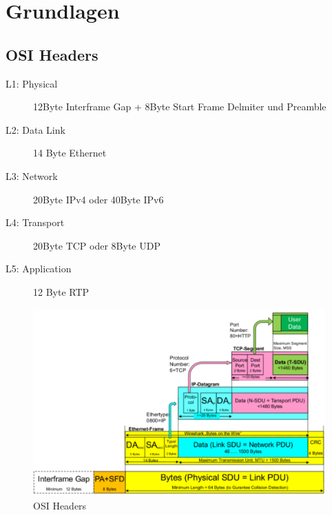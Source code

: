 


\newcommand{\SUBJECT}{Zusammenfassung}
\newcommand{\TITLE}{Computernetze 2}




\section{Grundlagen}
\subsection{OSI Headers}
\begin{description}
	\item[L1: Physical] 12Byte Interframe Gap + 8Byte Start Frame Delmiter und Preamble
	\item[L2: Data Link] 14 Byte Ethernet
	\item[L3: Network] 20Byte IPv4 oder 40Byte IPv6
	\item[L4: Transport] 20Byte TCP oder 8Byte UDP
	\item[L5: Application] 12 Byte RTP
\end{description}
\begin{figure}[h]
\centering
\includegraphics[width=0.7\linewidth]{images/osi_headers}
\caption{OSI Headers}
\end{figure}

